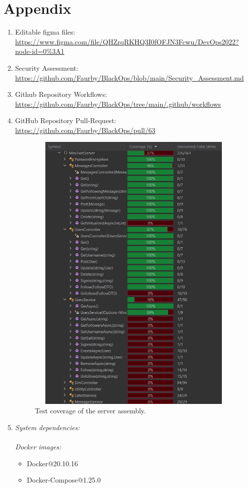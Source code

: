 \section{Appendix}
\label{sec:mpt}

\begin{enumerate}
    \item Editable figma files: \\
    \url{https://www.figma.com/file/QHZrqRKHQ3I0fOFJN3Fcwu/DevOps2022?node-id=0\%3A1}
    \item Security Assessment: \\
    \url{https://github.com/Faurby/BlackOps/blob/main/Security_Assessment.md}
    \item Github Repository Workflows: \\    \url{https://github.com/Faurby/BlackOps/tree/main/.github/workflows}
    \item GitHub Repository Pull-Request:\\
    \url{https://github.com/Faurby/BlackOps/pull/63}
    \begin{figure}[H]
    \centering
    \includegraphics[width=16cm,height=14cm,keepaspectratio]{Diagrams/test coverage server.jpg}
    \caption{Test coverage of the server assembly.}
    \label{ServerAssembly}
    \end{figure}
    \item \textit{System dependencies:}\\\\
    \textit{Docker images:}
    \begin{itemize}
        \item Docker@20.10.16
        \item Docker-Compose@1.25.0
    

\end{itemize}
\end{enumerate}
